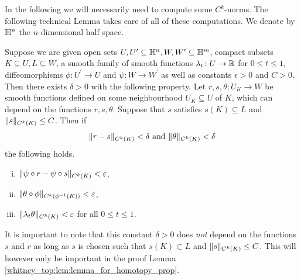 In the following we will necessarily need to compute some $C^k$-norms. The following technical Lemma takes care of all of these computations. We denote by $\mathbb{H}^n$ the $n$-dimensional half space.

\begin{lemma}
    \label{whitney_top:lem:technical_lemma_about_norms}
    Suppose we are given open sets $U, U^\prime \subseteq \mathbb{H}^n, W, W^\prime \subseteq \mathbb{H}^m$, compact subsets \linebreak $K \subseteq U, L \subseteq W$, a smooth family of smooth functions $\lambda_t \colon U \to \mathbb{R}$ for $0 \leq t \leq 1$, diffeomorphisms $\phi \colon U^\prime \to U$ and $\psi \colon W \to W^\prime$ as well as constants $\epsilon > 0$ and $C > 0$. Then there exists $\delta >0$ with the following property. Let $r,s, \theta \colon U_K \to W$ be smooth functions defined on some neighbourhood $U_K \subseteq U$ of $K$, which can depend on the functions $r,s,\theta$. Suppose that $s$ satisfies $s(K) \subseteq L$ and $\lVert s\rVert_{C^k(K)} \leq C$. Then if
    \[
    \lVert r - s\rVert_{C^k(K)} < \delta \text{ and } \lVert\theta\rVert_{C^k(K)} < \delta
    \]
    the following holds.
    \begin{enumerate}[(i)]
        \item \label{whitney_top:eq:ck_norm_lemma_part1} $\lVert\psi \circ r - \psi \circ s\rVert_{C^k(K)} < \varepsilon$,
        \item \label{whitney_top:eq:ck_norm_lemma_part2} $\lVert\theta \circ \phi\rVert_{C^k(\phi^{-1}(K))} < \varepsilon$,
        \item \label{whitney_top:eq:ck_norm_lemma_part3} $\lVert\lambda_t \theta\rVert_{C^k(K)} < \varepsilon$ for all $0 \leq t \leq 1$.
    \end{enumerate}
\end{lemma}

It is important to note that this constant $\delta > 0$ does \textit{not} depend on the functions $s$ and $r$ as long as $s$ is chosen such that $s(K) \subset L$ and $\lVert s\rVert_{C^k(K)} \leq C$. This will however only be important in the proof Lemma \ref{whitney_top:lem:lemma_for_homotopy_prop}. 

